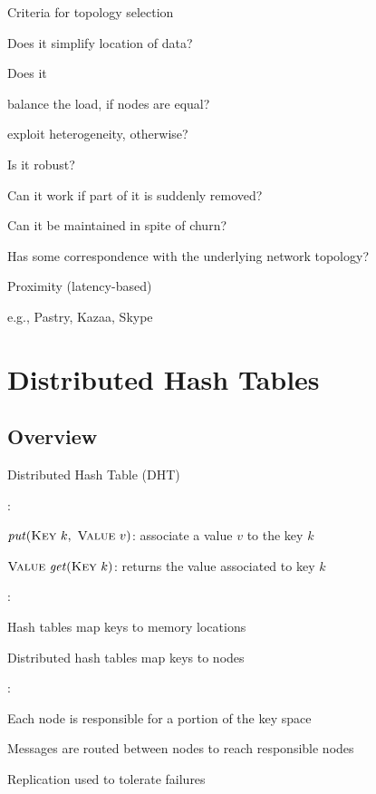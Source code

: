 
\begin{frame}{Criteria for topology selection}
	
	
\BIL
\item Does it simplify location of data?
\item Does it
	\BI
	\item balance the load, if nodes are equal?
	\item exploit heterogeneity, otherwise?
	\EI
\item Is it robust?
	\BI
	\item Can it work if part of it is suddenly removed?
	\item Can it be maintained in spite of churn?
	\EI
\item Has some correspondence with the underlying network topology?
\BI
\item Proximity (latency-based)
\item e.g., Pastry, Kazaa, Skype
\EI
\EIL
\end{frame}


\section{Distributed Hash Tables}

\subsection{Overview}

\begin{frame}{Distributed Hash Table (DHT)}

:\\
\BI
\item \alert{$\mathit{put}(\textsc{Key}\ k,\ \textsc{Value}\ v)$}: associate a value $v$ to the key $k$
\item \alert{$\textsc{Value}\ \mathit{get}(\textsc{Key}\ k)$}: returns the value associated to key $k$
\EI

\bigskip
{}:\\
\BI
\item Hash tables map keys to memory locations
\item Distributed hash tables map keys to nodes
\EI

\bigskip
{}:\\
\BI
\item Each node is responsible for a portion of the key space
\item Messages are routed between nodes to reach responsible nodes
\item Replication used to tolerate failures
\EI

\end{frame}

